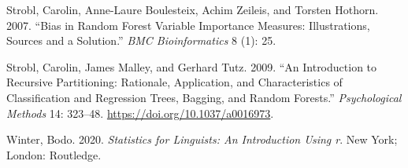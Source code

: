 \documentclass[
  11pt,
  letterpaper,
  DIV=11,
  numbers=noendperiod]{scrreprt}
\newlength{\cslhangindent}
\newenvironment{CSLReferences}[2] %
 {\begin{list}{}{%
  \setlength{\itemindent}{0pt}
  \setlength{\leftmargin}{0pt}
  \setlength{\parsep}{0pt}
  \ifodd #1
   \setlength{\leftmargin}{\cslhangindent}
   \setlength{\itemindent}{-1\cslhangindent}
  \fi
  \setlength{\itemsep}{#2\baselineskip}}}
 {\end{list}}
\begin{document}
\begin{CSLReferences}{1}{0}
Strobl, Carolin, Anne-Laure Boulesteix, Achim Zeileis, and Torsten
Hothorn. 2007. {``Bias in Random Forest Variable Importance Measures:
Illustrations, Sources and a Solution.''} \emph{BMC Bioinformatics} 8
(1): 25.

Strobl, Carolin, James Malley, and Gerhard Tutz. 2009. {``An
Introduction to Recursive Partitioning: Rationale, Application, and
Characteristics of Classification and Regression Trees, Bagging, and
Random Forests.''} \emph{Psychological Methods} 14: 323--48.
\url{https://doi.org/10.1037/a0016973}.

Winter, Bodo. 2020. \emph{Statistics for Linguists: An Introduction
Using r}. New York; London: Routledge.

\end{CSLReferences}
\end{document}
